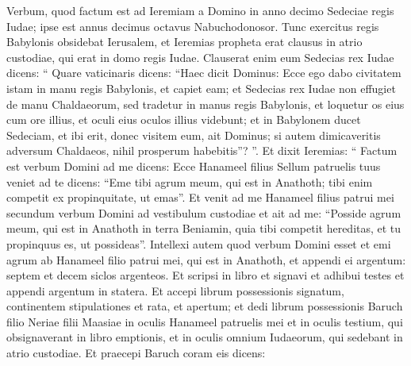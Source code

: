 \begin{biblechapter}
\begin{biblechapter}
\begin{biblechapter}
\begin{biblechapter}
\begin{biblechapter}
\begin{biblechapter}
\begin{biblechapter}
\begin{biblechapter}
\begin{biblechapter}
\begin{biblechapter}
\begin{biblechapter}
\begin{biblechapter}
\begin{biblechapter}
\begin{biblechapter}
\begin{biblechapter}
\begin{biblechapter}
\begin{biblechapter}
\begin{biblechapter}
\begin{biblechapter}
\begin{biblechapter}
\begin{biblechapter}
\begin{biblechapter}
\begin{biblechapter}
\begin{biblechapter}
\begin{biblechapter}
\begin{biblechapter}
\begin{biblechapter}
\begin{biblechapter}
\begin{biblechapter}
\begin{biblechapter}
\begin{biblechapter}
\begin{biblechapter}
\verse Verbum, quod factum est ad Ieremiam a Domino in anno decimo Sedeciae regis Iudae; ipse est annus decimus octavus Nabuchodonosor. 
\verse Tunc exercitus regis Babylonis obsidebat Ierusalem, et Ieremias propheta erat clausus in atrio custodiae, qui erat in domo regis Iudae. 
\verse Clauserat enim eum Sedecias rex Iudae dicens: “ Quare vaticinaris dicens: “Haec dicit Dominus: Ecce ego dabo civitatem istam in manu regis Babylonis, et capiet eam; 
\verse et Sedecias rex Iudae non effugiet de manu Chaldaeorum, sed tradetur in manus regis Babylonis, et loquetur os eius cum ore illius, et oculi eius oculos illius videbunt; 
\verse et in Babylonem ducet Sedeciam, et ibi erit, donec visitem eum, ait Dominus; si autem dimicaveritis adversum Chaldaeos, nihil prosperum habebitis”? ”.
 \verse Et dixit Ieremias: “ Factum est verbum Domini ad me dicens: 
\verse Ecce Hanameel filius Sellum patruelis tuus veniet ad te dicens: “Eme tibi agrum meum, qui est in Anathoth; tibi enim competit ex propinquitate, ut emas”. 
\verse Et venit ad me Hanameel filius patrui mei secundum verbum Domini ad vestibulum custodiae et ait ad me: “Posside agrum meum, qui est in Anathoth in terra Beniamin, quia tibi competit hereditas, et tu propinquus es, ut possideas”. Intellexi autem quod verbum Domini esset 
\verse et emi agrum ab Hanameel filio patrui mei, qui est in Anathoth, et appendi ei argentum: septem et decem siclos argenteos. 
\verse Et scripsi in libro et signavi et adhibui testes et appendi argentum in statera. 
\verse Et accepi librum possessionis signatum, continentem stipulationes et rata, et apertum; 
\verse et dedi librum possessionis Baruch filio Neriae filii Maasiae in oculis Hanameel patruelis mei et in oculis testium, qui obsignaverant in libro emptionis, et in oculis omnium Iudaeorum, qui sedebant in atrio custodiae. 
\verse Et praecepi Baruch coram eis dicens: 

\end{biblechapter}
\end{biblechapter}
\end{biblechapter}
\end{biblechapter}
\end{biblechapter}
\end{biblechapter}
\end{biblechapter}
\end{biblechapter}
\end{biblechapter}
\end{biblechapter}
\end{biblechapter}
\end{biblechapter}
\end{biblechapter}
\end{biblechapter}
\end{biblechapter}
\end{biblechapter}
\end{biblechapter}
\end{biblechapter}
\end{biblechapter}
\end{biblechapter}
\end{biblechapter}
\end{biblechapter}
\end{biblechapter}
\end{biblechapter}
\end{biblechapter}
\end{biblechapter}
\end{biblechapter}
\end{biblechapter}
\end{biblechapter}
\end{biblechapter}
\end{biblechapter}
\end{biblechapter}
